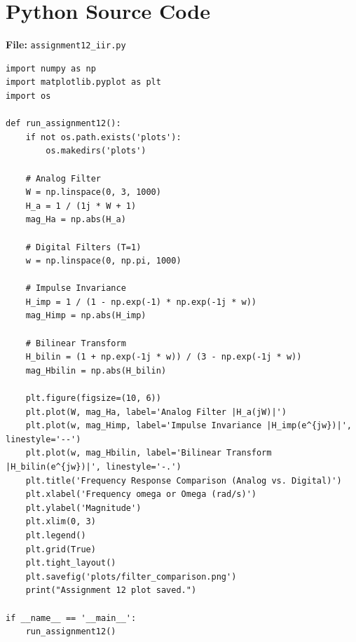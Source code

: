 \documentclass[11pt, a4paper]{article}
\begin{document}
\appendix
\section{Python Source Code}
\textbf{File:} \texttt{assignment12\_iir.py}
\begin{lstlisting}[caption={IIR Design: Impulse Invariance vs. Bilinear Transform -- Assignment 12}]
import numpy as np
import matplotlib.pyplot as plt
import os

def run_assignment12():
    if not os.path.exists('plots'):
        os.makedirs('plots')

    # Analog Filter
    W = np.linspace(0, 3, 1000)
    H_a = 1 / (1j * W + 1)
    mag_Ha = np.abs(H_a)

    # Digital Filters (T=1)
    w = np.linspace(0, np.pi, 1000)

    # Impulse Invariance
    H_imp = 1 / (1 - np.exp(-1) * np.exp(-1j * w))
    mag_Himp = np.abs(H_imp)

    # Bilinear Transform
    H_bilin = (1 + np.exp(-1j * w)) / (3 - np.exp(-1j * w))
    mag_Hbilin = np.abs(H_bilin)

    plt.figure(figsize=(10, 6))
    plt.plot(W, mag_Ha, label='Analog Filter |H_a(jW)|')
    plt.plot(w, mag_Himp, label='Impulse Invariance |H_imp(e^{jw})|', linestyle='--')
    plt.plot(w, mag_Hbilin, label='Bilinear Transform |H_bilin(e^{jw})|', linestyle='-.')
    plt.title('Frequency Response Comparison (Analog vs. Digital)')
    plt.xlabel('Frequency omega or Omega (rad/s)')
    plt.ylabel('Magnitude')
    plt.xlim(0, 3)
    plt.legend()
    plt.grid(True)
    plt.tight_layout()
    plt.savefig('plots/filter_comparison.png')
    print("Assignment 12 plot saved.")

if __name__ == '__main__':
    run_assignment12()
\end{lstlisting}
\end{document}
